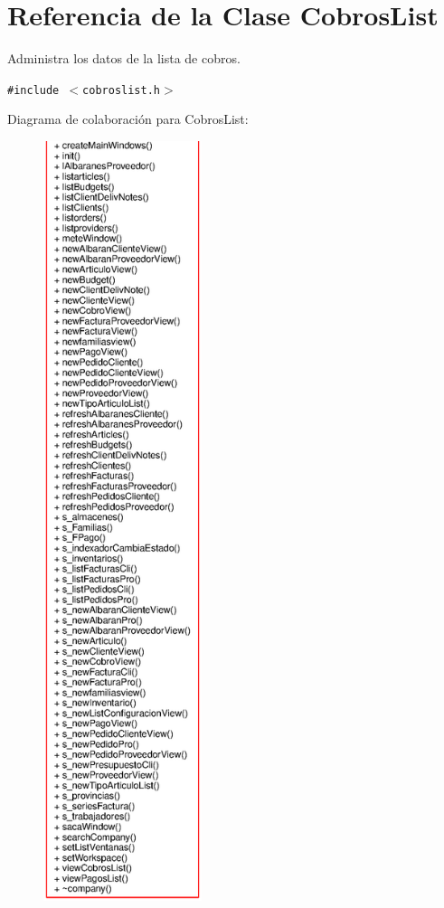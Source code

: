 \section{Referencia de la Clase Cobros\-List}
\label{classCobrosList}
Administra los datos de la lista de cobros.  


{\tt \#include $<$cobroslist.h$>$}

Diagrama de colaboraci\'{o}n para Cobros\-List:\begin{figure}[H]
\begin{center}
\leavevmode
\includegraphics[width=131pt]{classCobrosList__coll__graph}
\end{center}
\end{figure}
